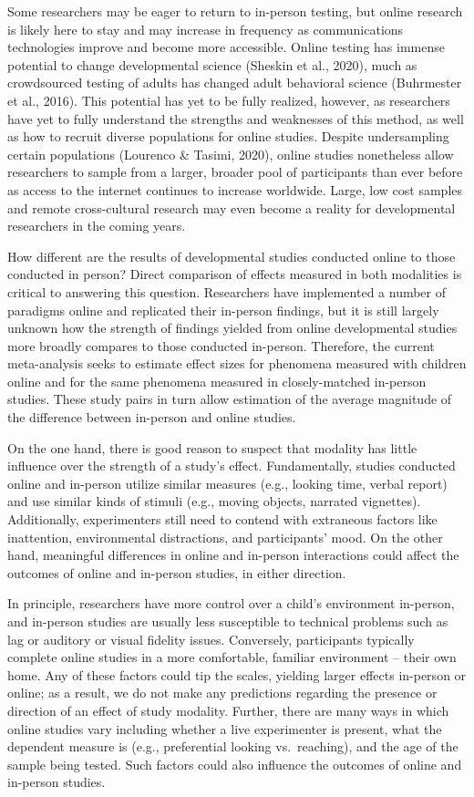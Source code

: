 \documentclass[
  man,floatsintext]{apa6}
\begin{document}
Some researchers may be eager to return to in-person testing, but online research is likely here to stay and may increase in frequency as communications technologies improve and become more accessible. Online testing has immense potential to change developmental science (Sheskin et al., 2020), much as crowdsourced testing of adults has changed adult behavioral science (Buhrmester et al., 2016). This potential has yet to be fully realized, however, as researchers have yet to fully understand the strengths and weaknesses of this method, as well as how to recruit diverse populations for online studies. Despite undersampling certain populations (Lourenco \& Tasimi, 2020), online studies nonetheless allow researchers to sample from a larger, broader pool of participants than ever before as access to the internet continues to increase worldwide. Large, low cost samples and remote cross-cultural research may even become a reality for developmental researchers in the coming years.

How different are the results of developmental studies conducted online to those conducted in person? Direct comparison of effects measured in both modalities is critical to answering this question. Researchers have implemented a number of paradigms online and replicated their in-person findings, but it is still largely unknown how the strength of findings yielded from online developmental studies more broadly compares to those conducted in-person. Therefore, the current meta-analysis seeks to estimate effect sizes for phenomena measured with children online and for the same phenomena measured in closely-matched in-person studies. These study pairs in turn allow estimation of the average magnitude of the difference between in-person and online studies.

On the one hand, there is good reason to suspect that modality has little influence over the strength of a study's effect. Fundamentally, studies conducted online and in-person utilize similar measures (e.g., looking time, verbal report) and use similar kinds of stimuli (e.g., moving objects, narrated vignettes). Additionally, experimenters still need to contend with extraneous factors like inattention, environmental distractions, and participants' mood. On the other hand, meaningful differences in online and in-person interactions could affect the outcomes of online and in-person studies, in either direction.

In principle, researchers have more control over a child's environment in-person, and in-person studies are usually less susceptible to technical problems such as lag or auditory or visual fidelity issues. Conversely, participants typically complete online studies in a more comfortable, familiar environment -- their own home. Any of these factors could tip the scales, yielding larger effects in-person or online; as a result, we do not make any predictions regarding the presence or direction of an effect of study modality. Further, there are many ways in which online studies vary including whether a live experimenter is present, what the dependent measure is (e.g., preferential looking vs.~reaching), and the age of the sample being tested. Such factors could also influence the outcomes of online and in-person studies.
\end{document}
